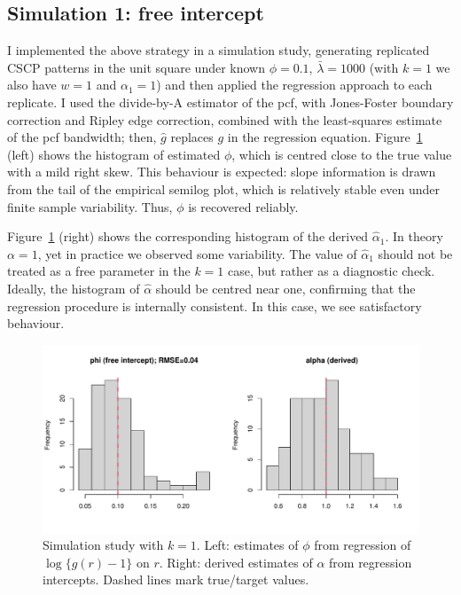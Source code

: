 \documentclass[11pt]{article}
\begin{document}
\subsection{Simulation 1: free intercept}

I implemented the above strategy in a simulation study, generating replicated CSCP patterns in the unit square under known $\phi=0.1$, $\bar{\lambda}=1000$ (with $k=1$ we also have $w=1$ and $\alpha_1=1$) and then applied the regression approach to each replicate. I used the divide-by-A estimator of the pcf, with Jones-Foster boundary correction and Ripley edge correction, combined with the least-squares estimate of the pcf bandwidth; then, $\hat{g}$ replaces $g$ in the regression equation. Figure~\ref{fig:phi_hist} (left) shows the histogram of estimated $\phi$, which is centred close to the true value with a mild right skew. This behaviour is expected: slope information is drawn from the tail of the empirical semilog plot, which is relatively stable even under finite sample variability. Thus, $\phi$ is recovered reliably.

Figure~\ref{fig:phi_hist} (right) shows the corresponding histogram of the derived $\hat{\alpha}_1$. In theory $\alpha=1$, yet in practice we observed some variability. The value of $\hat{\alpha}_1$ should not be treated as a free parameter in the $k=1$ case, but rather as a diagnostic check. Ideally, the histogram of $\hat{\alpha}$ should be centred near one, confirming that the regression procedure is internally consistent. In this case, we see satisfactory behaviour.

\begin{figure}[h]
	\centering
	\includegraphics[width=1\textwidth]{phi_hist1.pdf}
	\caption{Simulation study with $k=1$. Left: estimates of $\phi$ from regression of $\log\{\hat g(r)-1\}$ on $r$. Right: derived estimates of $\alpha$ from regression intercepts. Dashed lines mark true/target values.}
	\label{fig:phi_hist}
\end{figure}
\end{document}

